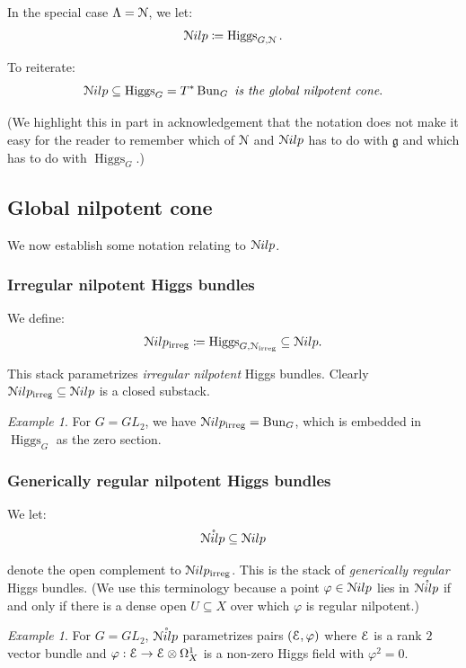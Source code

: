 \documentclass[reqno,11pt]{amsart}
\numberwithin{equation}{subsection}
\theoremstyle{remark}
\newtheorem{example}[thm]{Example}
\newcommand{\sE}{{\EuScript E}}
\newcommand{\sN}{{\EuScript N}}
\newcommand{\fg}{{\mathfrak g}}
\newcommand{\on}{\operatorname}
\newcommand{\vph}{\varphi}
\newcommand{\Bun}{\on{Bun}}
\renewcommand{\o}[1]{\mathring{#1}}
\renewcommand{\subset}{\subseteq}
\newcommand{\Nilp}{\sN ilp}
\newcommand{\Higgs}{\on{Higgs}}
\newcommand{\irreg}{\on{irreg}}
\begin{document}
In the special case $\Lambda = \sN$, we let:
%
\[
\Nilp \coloneqq \Higgs_{G,\sN}.
\]

\noindent To reiterate: 
%
\[
\Nilp \subset \Higgs_G = T^*\Bun_G \text{ \emph{is the global nilpotent cone}.} 
\]

\noindent (We highlight this in part in acknowledgement that the notation does 
not make it easy for the reader to remember which of $\sN$ and $\Nilp$ has
to do with $\fg$ and which has to do with $\Higgs_G$.)

\subsection{Global nilpotent cone}

We now establish some notation relating to $\Nilp$.

\subsubsection{Irregular nilpotent Higgs bundles}

We define:
%
\[
\Nilp_{\irreg} \coloneqq \Higgs_{G,\sN_{\irreg}} \subset \Nilp.
\]

\noindent This stack parametrizes \emph{irregular nilpotent} Higgs bundles.
Clearly $\Nilp_{\irreg} \subset \Nilp$ is a closed substack.

\begin{example}

For $G = GL_2$, we have $\Nilp_{\irreg} = \Bun_G$, which 
is embedded in $\Higgs_G$ as the zero section.

\end{example}

\subsubsection{Generically regular nilpotent Higgs bundles}

We let:
%
\[
\o{\Nilp} \subset \Nilp
\]

\noindent denote the open complement to $\Nilp_{\irreg}$.
This is the stack of \emph{generically regular} Higgs bundles.
(We use this terminology because a point $\vph \in \Nilp$ lies
in $\o{\Nilp}$ if and only if there
is a dense open $U \subset X$ over which $\vph$ is regular nilpotent.)

\begin{example}

For $G = GL_2$, $\o{\Nilp}$ parametrizes pairs $(\sE,\vph)$ where
$\sE$ is a rank $2$ vector bundle and $\vph:\sE \to \sE \otimes \Omega_X^1$
is a non-zero Higgs field with $\vph^2 = 0$.

\end{example}
\end{document}
